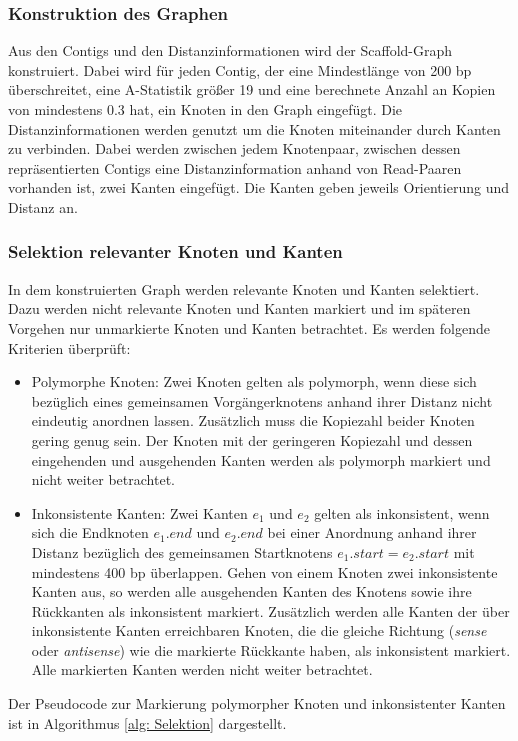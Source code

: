 \documentclass[a4paper,11pt,parskip]{scrartcl}
\begin{document}
\subsubsection{Konstruktion des Graphen}
Aus den Contigs und den Distanzinformationen wird der Scaffold-Graph
konstruiert. Dabei wird für jeden Contig, der eine Mindestlänge von
200 bp überschreitet, eine A-Statistik größer 19 und eine berechnete
Anzahl an Kopien von mindestens \num{0.3} hat, ein Knoten in den Graph
eingefügt. Die Distanzinformationen werden genutzt um die Knoten
miteinander durch Kanten zu verbinden. Dabei werden zwischen jedem
Knotenpaar, zwischen dessen repräsentierten Contigs eine
Distanzinformation anhand von Read-Paaren vorhanden ist, zwei Kanten
eingefügt. Die Kanten geben jeweils Orientierung und Distanz an.

\subsubsection{Selektion relevanter Knoten und Kanten}
In dem konstruierten Graph werden relevante Knoten und Kanten
selektiert. Dazu werden nicht relevante Knoten und Kanten markiert und
im späteren Vorgehen nur unmarkierte Knoten und Kanten betrachtet. Es
werden folgende Kriterien überprüft:
\begin{itemize}
\item Polymorphe Knoten: Zwei Knoten gelten als polymorph, wenn diese
  sich bezüglich eines gemeinsamen Vorgängerknotens anhand ihrer
  Distanz nicht eindeutig anordnen lassen. Zusätzlich muss die
  Kopiezahl beider Knoten gering genug sein. Der Knoten mit der
  geringeren Kopiezahl und dessen eingehenden und ausgehenden Kanten
  werden als polymorph markiert und nicht weiter betrachtet.
\item Inkonsistente Kanten: Zwei Kanten $e_1$ und $e_2$ gelten als
  inkonsistent, wenn sich die Endknoten $e_1.end$ und $e_2.end$ bei
  einer Anordnung anhand ihrer Distanz bezüglich des gemeinsamen
  Startknotens $e_1.start = e_2.start$ mit mindestens 400 bp
  überlappen. Gehen von einem Knoten zwei inkonsistente Kanten aus, so
  werden alle ausgehenden Kanten des Knotens sowie ihre Rückkanten als
  inkonsistent markiert. Zusätzlich werden alle Kanten der über
  inkonsistente Kanten erreichbaren Knoten, die die gleiche Richtung
  (\textit{sense} oder \textit{antisense}) wie die markierte Rückkante
  haben, als inkonsistent markiert. Alle markierten Kanten werden
  nicht weiter betrachtet.
\end{itemize}
Der Pseudocode zur Markierung polymorpher Knoten und inkonsistenter
Kanten ist in Algorithmus \ref{alg: Selektion} dargestellt.
\end{document}
